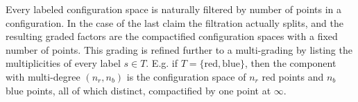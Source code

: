 \documentclass[12pt]{article}
\newcommand{\SymGroup}[1][n]{\mathfrak{S}_{#1}}
\theoremstyle{plain}
\theoremstyle{definition}
\theoremstyle{remark}
\newtheorem{rmk}[thm]{Remark}
\begin{document}
    

Every labeled configuration space is naturally filtered by number of points in a configuration. In the case of the last claim the filtration actually splits, and the resulting graded factors are the compactified configuration spaces with a fixed number of points.
This grading is refined further to a multi-grading by listing the multiplicities of every label $s\in T$. E.g. if $T = \{\text{red},\text{blue}\}$, then the component with multi-degree $(n_r,n_b)$ is the configuration space of $n_r$ red points and $n_b$ blue points, all of which distinct, compactified by one point at $\infty$.
\end{document}
